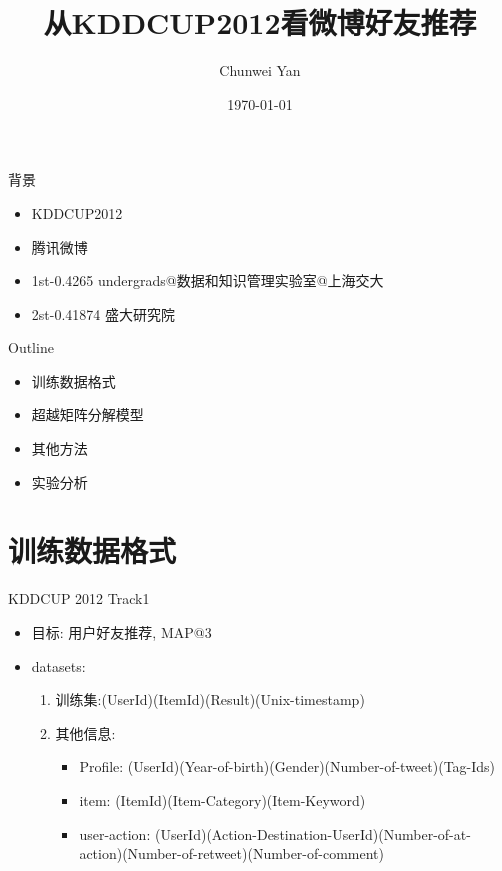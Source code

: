 \documentclass{beamer}
\title{从KDDCUP2012看微博好友推荐}
\author{Chunwei Yan}
\institute[PKUSZ]{
\texttt{superjom@sz.pku.edu.cn}
}
\date{\today}
\begin{document}
\begin{frame}[plain]
  \titlepage
\end{frame}


\begin{frame}{背景}
\begin{itemize}
    \item KDDCUP2012
    \item 腾讯微博
    \item 1st-0.4265 undergrads@数据和知识管理实验室@上海交大
    \item 2st-0.41874 盛大研究院
\end{itemize}
\end{frame}

\begin{frame}{Outline}
    \begin{itemize}
        \item 训练数据格式
        \item 超越矩阵分解模型
        \item 其他方法
        \item 实验分析
    \end{itemize}
\end{frame}

\section{训练数据格式}

\begin{frame}{KDDCUP 2012 Track1}
    \begin{itemize}
    \item 目标: 用户好友推荐, MAP@3
    \pause
    \item datasets: 
        \begin{enumerate}
        \item 训练集:(UserId)(ItemId)(Result)(Unix-timestamp)
        \item 其他信息:
            \begin{itemize}
                \item Profile: (UserId)(Year-of-birth)(Gender)(Number-of-tweet)(Tag-Ids)
                \item item: (ItemId)(Item-Category)(Item-Keyword)
                \item user-action: (UserId)(Action-Destination-UserId)(Number-of-at-action)(Number-of-retweet)(Number-of-comment)
            \end{itemize}
        \end{enumerate}
    \end{itemize}
\end{frame}
\end{document}
